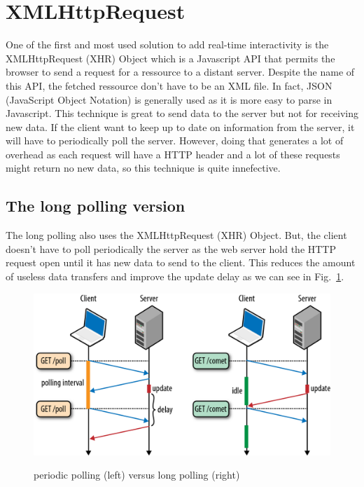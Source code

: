 \documentclass[journal,compsoc]{IEEEtran}
\begin{document}
\section{XMLHttpRequest}

One of the first and most used solution to add real-time interactivity is the XMLHttpRequest (XHR) Object which is a Javascript API that permits the browser to send a request for a ressource to a distant server.
Despite the name of this API, the fetched ressource don't have to be an XML file.
In fact, JSON (JavaScript Object Notation) is generally used as it is more easy to parse in Javascript.
This technique is great to send data to the server but not for receiving new data.
If the client want to keep up to date on information from the server, it will have to periodically poll the server.
However, doing  that generates a lot of overhead as each request will have a HTTP header and a lot of these requests might return no new data, so this technique is quite innefective.

\subsection{The long polling version}

The long polling also uses the XMLHttpRequest (XHR) Object.
But, the client doesn't have to poll periodically the server as the web server hold the HTTP request open until it has new data to send to the client.
This reduces the amount of useless data transfers and improve the update delay as we can see in Fig.~\ref{poll_vs_lpoll}.

\begin{figure}
  \centering
  \includegraphics[width=\linewidth]{poll_vs_lpoll}
  \label{poll_vs_lpoll}
  \caption{periodic polling (left) versus long polling (right)}
\end{figure}
\end{document}
